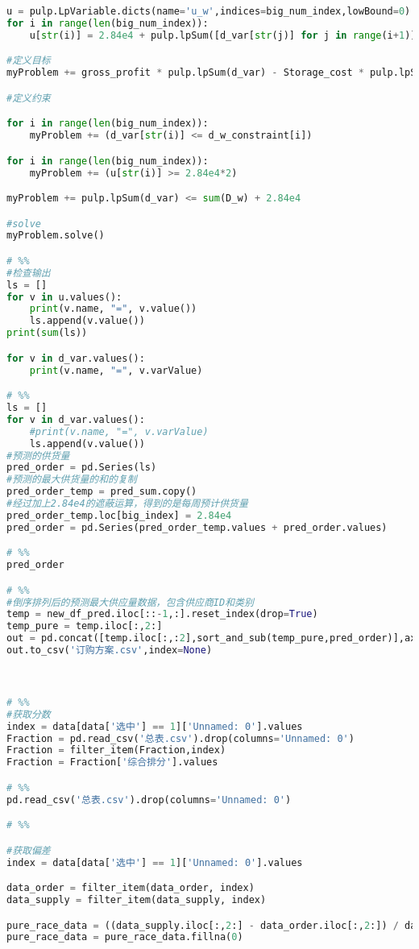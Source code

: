 \begin{appendices}
\begin{lstlisting}[language=python]
u = pulp.LpVariable.dicts(name='u_w',indices=big_num_index,lowBound=0)
for i in range(len(big_num_index)):
    u[str(i)] = 2.84e4 + pulp.lpSum([d_var[str(j)] for j in range(i+1)]) - sum(D_w[:i+1])

#定义目标
myProblem += gross_profit * pulp.lpSum(d_var) - Storage_cost * pulp.lpSum(u)

#定义约束

for i in range(len(big_num_index)):
    myProblem += (d_var[str(i)] <= d_w_constraint[i])

for i in range(len(big_num_index)):
    myProblem += (u[str(i)] >= 2.84e4*2)

myProblem += pulp.lpSum(d_var) <= sum(D_w) + 2.84e4

#solve
myProblem.solve()

# %%
#检查输出
ls = []
for v in u.values():
    print(v.name, "=", v.value())
    ls.append(v.value())
print(sum(ls))

for v in d_var.values():
    print(v.name, "=", v.varValue)

# %%
ls = []
for v in d_var.values():
    #print(v.name, "=", v.varValue)
    ls.append(v.value())
#预测的供货量
pred_order = pd.Series(ls)
#预测的最大供货量的和的复制
pred_order_temp = pred_sum.copy()
#经过加上2.84e4的遮蔽运算，得到的是每周预计供货量
pred_order_temp.loc[big_index] = 2.84e4
pred_order = pd.Series(pred_order_temp.values + pred_order.values)

# %%
pred_order

# %%
#倒序排列后的预测最大供应量数据，包含供应商ID和类别
temp = new_df_pred.iloc[::-1,:].reset_index(drop=True)
temp_pure = temp.iloc[:,2:]
out = pd.concat([temp.iloc[:,:2],sort_and_sub(temp_pure,pred_order)],axis=1)
out.to_csv('订购方案.csv',index=None)



# %%
#获取分数
index = data[data['选中'] == 1]['Unnamed: 0'].values
Fraction = pd.read_csv('总表.csv').drop(columns='Unnamed: 0')
Fraction = filter_item(Fraction,index)
Fraction = Fraction['综合排分'].values

# %%
pd.read_csv('总表.csv').drop(columns='Unnamed: 0')

# %%

#获取偏差
index = data[data['选中'] == 1]['Unnamed: 0'].values

data_order = filter_item(data_order, index)
data_supply = filter_item(data_supply, index)

pure_race_data = ((data_supply.iloc[:,2:] - data_order.iloc[:,2:]) / data_order.iloc[:,2:])
pure_race_data = pure_race_data.fillna(0)


\end{lstlisting}
\end{appendices}
